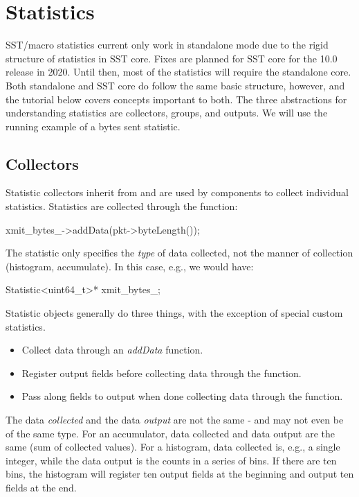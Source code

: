
\section{Statistics}
\label{sec:Statistics}

SST/macro statistics current only work in standalone mode due to the rigid structure of statistics in SST core.
Fixes are planned for SST core for the 10.0 release in 2020.
Until then, most of the statistics will require the standalone core.
Both standalone and SST core do follow the same basic structure, however, and the tutorial below covers concepts important to both.
The three abstractions for understanding statistics are collectors, groups, and outputs.
We will use the running example of a bytes sent statistic.

\subsection{Collectors}
\label{subsec:collectors}

Statistic collectors inherit from  and are used by components to collect individual statistics.
Statistics are collected through the  function:

\begin{CppCode}
xmit_bytes_->addData(pkt->byteLength());
\end{CppCode}
The statistic only specifies the \emph{type} of data collected, not the manner of collection (histogram, accumulate).
In this case, e.g., we would have:

\begin{CppCode}
Statistic<uint64_t>* xmit_bytes_;
\end{CppCode}
Statistic objects generally do three things, with the exception of special custom statistics.

\begin{itemize}
\item Collect data through an \emph{addData} function.
\item Register output fields before collecting data through the  function.
\item Pass along fields to output when done collecting data through the  function.
\end{itemize}

The data \emph{collected} and the data \emph{output} are not the same - and may not even be of the same type.
For an accumulator, data collected and data output are the same (sum of collected values).
For a histogram, data collected is, e.g., a single integer, while the data output is the counts in a series of bins.
If there are ten bins, the histogram will register ten output fields at the beginning and output ten fields at the end.

